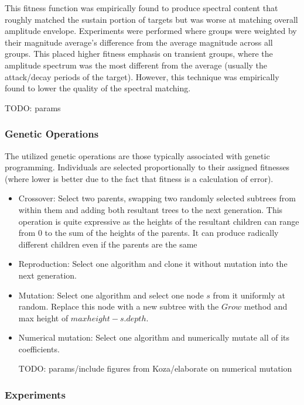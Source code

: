 \documentclass[12pt]{article}
\begin{document}
This fitness function was empirically found to produce spectral content that roughly matched the sustain portion of targets but was worse at matching overall amplitude envelope. Experiments were performed where groups were weighted by their magnitude average's difference from the average magnitude across all groups. This placed higher fitness emphasis on transient groups, where the amplitude spectrum was the most different from the average (usually the attack/decay periods of the target). However, this technique was empirically found to lower the quality of the spectral matching.

TODO: params
\subsubsection{Genetic Operations}
The utilized genetic operations are those typically associated with genetic programming. Individuals are selected proportionally to their assigned fitnesses (where lower is better due to the fact that fitness is a calculation of error).
\begin{itemize}
\item
Crossover: Select two parents, swapping two randomly selected subtrees from within them and adding both resultant trees to the next generation. This operation is quite expressive as the heights of the resultant children can range from 0 to the sum of the heights of the parents. It can produce radically different children even if the parents are the same
\item
Reproduction: Select one algorithm and clone it without mutation into the next generation.
\item
Mutation: Select one algorithm and select one node $s$ from it uniformly at random. Replace this node with a new subtree with the $Grow$ method and max height of $maxheight - s.depth$.
\item
Numerical mutation: Select one algorithm and numerically mutate all of its coefficients.

TODO: params/include figures from Koza/elaborate on numerical mutation
\end{itemize}
\subsubsection{Experiments}
\begin{comment}
Ideally one would ``clean'' the WAV file as much as possible by removing areas of silence, removing any DC offset and normalizing.
\end{comment}
\end{document}
